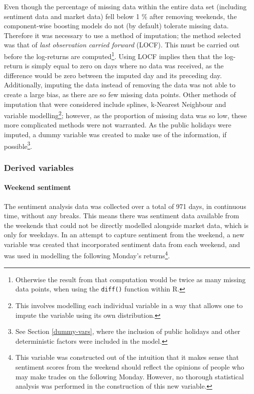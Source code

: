\documentclass{article}
\begin{document}
Even though the percentage of missing data within the entire data set (including sentiment data and market data) fell below 1 \% after removing weekends, the component-wise boosting models do not (by default) tolerate missing data. Therefore it was necessary to use a method of imputation; the method selected was that of \emph{last observation carried forward} (LOCF). This must be carried out before the log-returns are computed\footnote{Otherwise the result from that computation would be twice as many missing data points, when using the \texttt{diff()} function within R.}. Using LOCF implies then that the log-return is simply equal to zero on days where no data was received, as the difference would be zero between the imputed day and its preceding day. Additionally, imputing the data instead of removing the data was not able to create a large bias, as there are so few missing data points. Other methods of imputation that were considered include splines, k-Nearest Neighbour and variable modelling\footnote{This involves modelling each individual variable in a way that allows one to impute the variable using its own distribution.}; however, as the proportion of missing data was so low, these more complicated methods were not warranted. As the public holidays were imputed, a dummy variable was created to make use of the information, if possible\footnote{See Section \ref{dummy-vars}, where the inclusion of public holidays and other deterministic factors were included in the model.}.


\subsubsection{Derived variables}
\label{sec-6-2-3}


\paragraph{Weekend sentiment \label{weekend-sent}}
\label{sec-6-2-3-1}

The sentiment analysis data was collected over a total of 971 days, in continuous time, without any breaks. This means there was sentiment data available from the weekends that could not be directly modelled alongside market data, which is only for weekdays. In an attempt to capture sentiment from the weekend, a new variable was created that incorporated sentiment data from each weekend, and was used in modelling the following Monday's returns\footnote{This variable was constructed out of the intuition that it makes sense that sentiment scores from the weekend should reflect the opinions of people who may make trades on the following Monday. However, no thorough statistical analysis was performed in the construction of this new variable.}.
\end{document}
